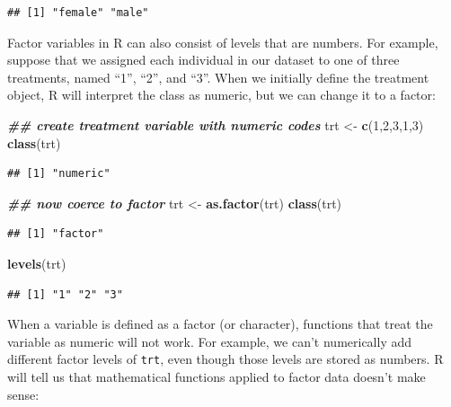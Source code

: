 \documentclass[
]{book}
\newenvironment{Shaded}{\begin{snugshade}}{\end{snugshade}}
\newcommand{\DecValTok}[1]{\textcolor[rgb]{0.00,0.00,0.81}{#1}}
\newcommand{\DocumentationTok}[1]{\textcolor[rgb]{0.56,0.35,0.01}{\textbf{\textit{#1}}}}
\newcommand{\FunctionTok}[1]{\textcolor[rgb]{0.13,0.29,0.53}{\textbf{#1}}}
\newcommand{\NormalTok}[1]{#1}
\newcommand{\OtherTok}[1]{\textcolor[rgb]{0.56,0.35,0.01}{#1}}
\begin{document}
\begin{verbatim}
## [1] "female" "male"
\end{verbatim}

Factor variables in R can also consist of levels that are numbers. For example, suppose that we assigned each individual in our dataset to one of three treatments, named ``1'', ``2'', and ``3''. When we initially define the treatment object, R will interpret the class as numeric, but we can change it to a factor:

\begin{Shaded}
\begin{Highlighting}[]
\DocumentationTok{\#\# create treatment variable with numeric codes}
\NormalTok{trt }\OtherTok{\textless{}{-}} \FunctionTok{c}\NormalTok{(}\DecValTok{1}\NormalTok{,}\DecValTok{2}\NormalTok{,}\DecValTok{3}\NormalTok{,}\DecValTok{1}\NormalTok{,}\DecValTok{3}\NormalTok{)}
\FunctionTok{class}\NormalTok{(trt)}
\end{Highlighting}
\end{Shaded}

\begin{verbatim}
## [1] "numeric"
\end{verbatim}

\begin{Shaded}
\begin{Highlighting}[]
\DocumentationTok{\#\# now coerce to factor}
\NormalTok{trt }\OtherTok{\textless{}{-}} \FunctionTok{as.factor}\NormalTok{(trt)}
\FunctionTok{class}\NormalTok{(trt)}
\end{Highlighting}
\end{Shaded}

\begin{verbatim}
## [1] "factor"
\end{verbatim}

\begin{Shaded}
\begin{Highlighting}[]
\FunctionTok{levels}\NormalTok{(trt)}
\end{Highlighting}
\end{Shaded}

\begin{verbatim}
## [1] "1" "2" "3"
\end{verbatim}

When a variable is defined as a factor (or character), functions that treat the variable as numeric will not work. For example, we can't numerically add different factor levels of \texttt{trt}, even though those levels are stored as numbers. R will tell us that mathematical functions applied to factor data doesn't make sense:
\end{document}
